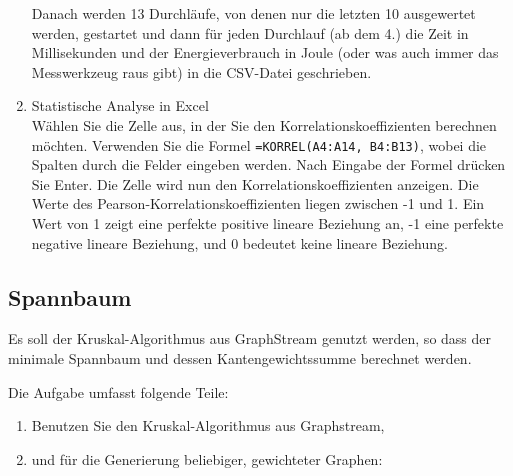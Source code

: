 \documentclass{article}
\begin{document}
\begin{appendix}
\begin{enumerate}
					Danach werden 13 Durchläufe, von denen nur die letzten 10 ausgewertet werden, gestartet und 
					dann für jeden Durchlauf (ab dem 4.) die Zeit in Millisekunden und der Energieverbrauch in Joule 
					(oder was auch immer das Messwerkzeug raus gibt)
					in die  CSV-Datei geschrieben. 
					
					
					\item Statistische Analyse in Excel\\
					      Wählen Sie die Zelle aus, in der Sie den Korrelationskoeffizienten berechnen möchten.
								Verwenden Sie die Formel \texttt{=KORREL(A4:A14, B4:B13)}, wobei die Spalten durch die Felder 
								eingeben werden.  Nach Eingabe der Formel drücken Sie Enter. 
								Die Zelle wird nun den Korrelationskoeffizienten anzeigen.
Die Werte des Pearson-Korrelationskoeffizienten liegen zwischen -1 und 1. Ein Wert von 1 zeigt eine perfekte positive lineare Beziehung an, -1 eine perfekte negative lineare Beziehung, und 0 bedeutet keine lineare Beziehung.
					\end{enumerate}

\newpage					
\subsection*{Spannbaum}

Es soll der Kruskal-Algorithmus aus GraphStream genutzt werden,  so dass  der minimale Spannbaum   und dessen Kantengewichtssumme berechnet werden.

Die Aufgabe umfasst folgende Teile:

			\begin{enumerate}
			  \item Benutzen Sie den Kruskal-Algorithmus aus Graphstream,
				\item und für die Generierung beliebiger, gewichteter Graphen:
				

\end{enumerate}
\end{appendix}
\end{document}
